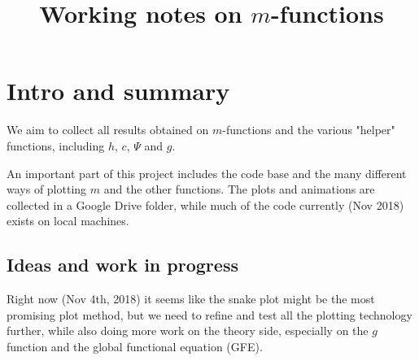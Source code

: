 \documentclass[a4paper]{amsart}
\begin{document}
\title{Working notes on $m$-functions}
\maketitle

\tableofcontents

\section{Intro and summary}

We aim to collect all results obtained on $m$-functions and the various "helper" functions, including $h$, $c$, $\Psi$ and $g$.

An important part of this project includes the code base and the many different ways of plotting $m$ and the other functions. The plots and animations are collected in a Google Drive folder, while much of the code currently (Nov 2018) exists on local machines.



\subsection{Ideas and work in progress}

Right now (Nov 4th, 2018) it seems like the snake plot might be the most promising plot method, but we need to refine and test all the plotting technology further, while also doing more work on the theory side, especially on the $g$ function and the global functional equation (GFE).
\end{document}
